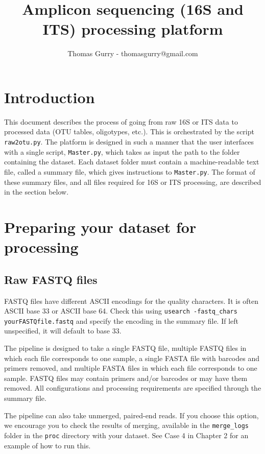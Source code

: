 \documentclass[11pt, oneside]{article}   	%
\title{Amplicon sequencing (16S and ITS) processing platform}
\author{Thomas Gurry - thomasgurry@gmail.com}
\date{}							%
\begin{document}
\maketitle
\section{Introduction}
This document describes the process of going from raw 16S or ITS data to processed data (OTU tables, oligotypes, etc.).  This is orchestrated by the script {\tt raw2otu.py}.  The platform is designed in such a manner that the user interfaces with a single script, {\tt Master.py}, which takes as input the path to the folder containing the dataset.  Each dataset folder must contain a machine-readable text file, called a summary file, which gives instructions to {\tt Master.py}.  The format of these summary files, and all files required for 16S or ITS processing, are described in the section below.

\section{Preparing your dataset for processing}
\subsection{Raw FASTQ files}
FASTQ files have different ASCII encodings for the quality characters.  It is often ASCII base 33 or ASCII base 64.  Check this using {\tt usearch -fastq\_chars yourFASTQfile.fastq} and specify the encoding in the summary file.  If left unspecified, it will default to base 33.

The pipeline is designed to take a single FASTQ file, multiple FASTQ files in which each file corresponds to one sample, a single FASTA file with barcodes and primers removed, and multiple FASTA files in which each file corresponds to one sample. FASTQ files may contain primers and/or barcodes or may have them removed. All configurations and processing requirements are specified through the summary file.

The pipeline can also take unmerged, paired-end reads. If you choose this option, we encourage you to check the results of merging, available in the {\tt merge\_logs} folder in the {\tt proc} directory with your dataset. See Case 4 in Chapter 2 for an example of how to run this.
\end{document}
